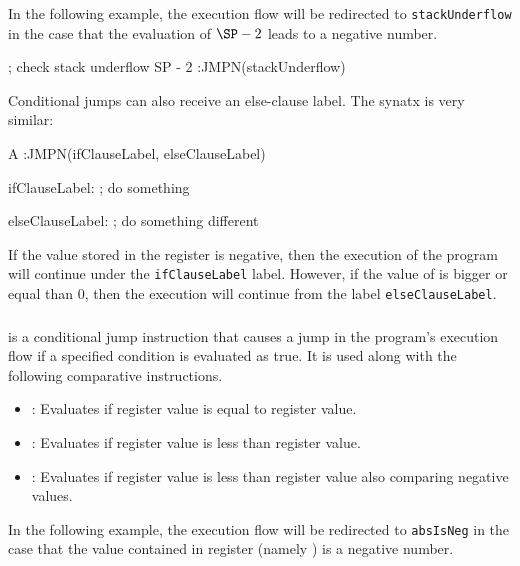 In the following example, the execution flow will be redirected to \texttt{stackUnderflow} in the case that the evaluation of $\SP - 2$ leads to a negative number.

\begin{zkasm}
; check stack underflow
SP - 2          :JMPN(stackUnderflow)
\end{zkasm}

Conditional jumps can also receive an else-clause label. The synatx is very similar:

\begin{zkasm}
A					:JMPN(ifClauseLabel, elseClauseLabel)


ifClauseLabel:
        ; do something
        
        
elseClauseLabel:
        ; do something different
\end{zkasm}

If the value stored in the \A register is negative, then the execution of the program will continue under the \texttt{ifClauseLabel} label. However, if the value of \A is bigger or equal than $0$, then the execution will continue from the label \texttt{elseClauseLabel}. 




\subsubsection{\JMPC} %

\JMPC is a conditional jump instruction that causes a jump in the program's execution flow if a specified condition is evaluated  as true. It is used along with the following comparative instructions.
\begin{itemize}
    \item \EQ: Evaluates if register \A value is equal to register \B value.
    \item \LT: Evaluates if register \A value is less than register \B value.
    \item \SLT: Evaluates if register \A value is less than register \B value also comparing negative values.
\end{itemize}

In the following example, the execution flow will be redirected to \texttt{absIsNeg} in the case that the value contained in register \A (namely \val) is a negative number.






